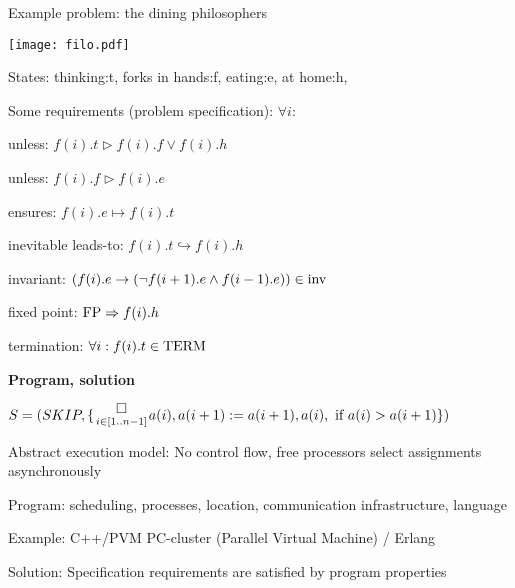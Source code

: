 \documentclass[compress]{beamer}
\def\u{\hfill\break}
\def\unless {\rhd}
\def\ensures {\mapsto}
\def\inev {\hookrightarrow}
\def\fixpont {{\rm FP}}
\def\term {{\rm TERM}}
\def\inv{{\rm inv}}
\def\underset#1#2#3{{ {\displaystyle #3}\atop {#1} }}
\def\underset#1#2#3{{ {\displaystyle #3}\atop {#1} }}
\begin{document}
\begin{frame}{Example problem: the dining philosophers}


\centerline{\texttt{[image: filo.pdf]}}

States: thinking:t, forks in hands:f, eating:e, at home:h,  

\end{frame}

\begin{frame}{}


Some requirements (problem specification):  $\forall  i : $

unless: $ f(i).t \unless f(i).f \lor f(i).h$

unless: $ f(i).f \unless f(i).e$
 
ensures: $f(i).e \ensures f(i).t$

inevitable leads-to: $f(i).t \inev f(i).h$

invariant: $ (f(i).e \rightarrow (\lnot f(i+1).e \land f(i-1).e))  \in 
\inv$

fixed point: $ \fixpont \Rightarrow f(i).h$

termination: $ \forall i: f(i).t \in \term $

\end{frame}

\begin{frame}{}

\centerline{\bf Program, solution}

$S = (SKIP, \u
\{
\underset{i \in [1..n-1]}\to{\Box}  a(i),a(i+1) := a(i+1),a(i), \  \mbox{if} \ 
a(i) > a(i+1) \})$

\bigskip

Abstract execution model: No control flow, free processors select 
assignments asynchronously

Program: scheduling, processes, location, communication 
infrastructure, language 

Example: C++/PVM PC-cluster  (Parallel Virtual Machine) / Erlang

Solution: Specification requirements are satisfied by
program properties

\end{frame}
\end{document}
